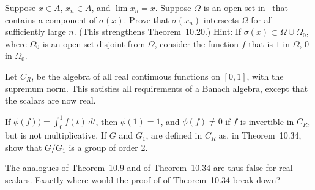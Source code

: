 \begin{enumerate}
\begin{excopy}
Suppose \(x \in A\), \(x_n \in A\), and \(\lim x_n = x\).
  Suppose \(\Omega\) is an open set in \C\ that
contains a component of \(\sigma(x)\).
  Prove that \(\sigma(x_n)\) intersects \(\Omega\) for all sufficiently
large $n$. (This strengthens Theorem~10.20.) Hint:
  If \(\sigma(x) \subset \Omega \cup \Omega_0\), where \(\Omega_0\) is
an open set disjoint from \(\Omega\),
  consider the function $f$ that is $1$ in \(\Omega\), $0$ in \(\Omega_0\).
\end{excopy}
\unfinished

\begin{excopy}
Let \(C_R\), be the algebra of all real continuous functions on \([0, 1]\),
  with the
supremum norm. This satisfies all requirements of a Banach algebra, except that
the scalars are now real.
\begin{itemize}
 If \(\phi(f)) = \int_0^1 f(t)\,dt\), then \(\phi(1) = 1\),
  and \(\phi(f) \neq 0\) if $f$ is invertible in \(C_R\), but
  is not multiplicative.
 If $G$ and \(G_1\), are defined in \(C_R\) as, in Theorem~10.34,
  show that \(G/G_1\) is a
  group of order 2.
\end{itemize}
The analogues of Theorem~10.9 and  of Theorem~10.34 are thus false
for real scalars. Exactly where would the proof of  of Theorem~10.34
break down?
\end{excopy}
\unfinished

\begin{excopy}
\end{excopy}
\unfinished

\end{enumerate}
